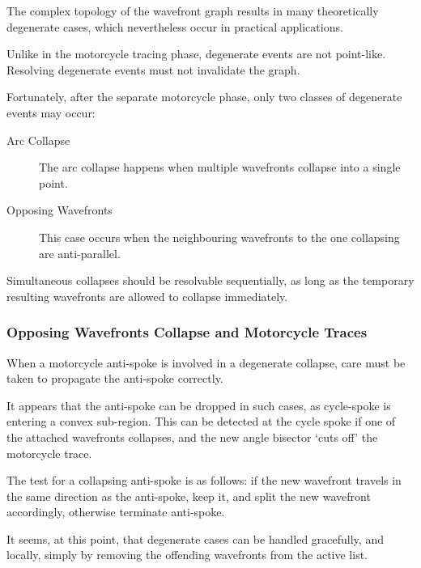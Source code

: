 \documentclass[12pt,a4paper,oneside,openany]{article}
\begin{document}
The complex topology of the wavefront graph results in many theoretically degenerate cases, which nevertheless occur in practical applications.

Unlike in the motorcycle tracing phase, degenerate events are not point-like. Resolving degenerate events must not invalidate the graph.

Fortunately, after the separate motorcycle phase, only two classes of degenerate events may occur:
\begin{description}
\item[Arc Collapse] The arc collapse happens when multiple wavefronts collapse into a single point. 
\item[Opposing Wavefronts] This case occurs when the neighbouring wavefronts to the one collapsing are anti-parallel.
\end{description}

Simultaneous collapses should be resolvable sequentially, as long as the temporary resulting wavefronts are allowed to collapse immediately.

\subsubsection{Opposing Wavefronts Collapse and Motorcycle Traces}

When a motorcycle anti-spoke is involved in a degenerate collapse, care must be taken to propagate the anti-spoke correctly.

It appears that the anti-spoke can be dropped in such cases, as cycle-spoke is entering a convex sub-region. This can be detected at the cycle spoke if one of the attached wavefronts collapses, and the new angle bisector `cuts off' the motorcycle trace.

The test for a collapsing anti-spoke is as follows: if the new wavefront travels in the same direction as the anti-spoke, keep it, and split the new wavefront accordingly, otherwise terminate anti-spoke. 

It seems, at this point, that degenerate cases can be handled gracefully, and locally, simply by removing the offending wavefronts from the active list.

%
%
\end{document}
